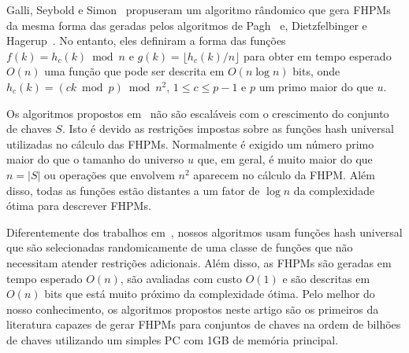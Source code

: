 Galli, Seybold e Simon~\cite{gss01} propuseram um algoritmo r\^andomico
que gera FHPMs da mesma forma das geradas pelos algoritmos de Pagh~\cite{p99}
e, Dietzfelbinger e Hagerup~\cite{dh01}. No entanto, eles definiram a forma das 
fun\c{c}\~oes $f(k) = h_c(k) \bmod n$ e $g(k) = \lfloor h_c(k)/n \rfloor$ para obter em tempo esperado $O(n)$ uma fun\c{c}\~ao que pode ser descrita em $O(n\log n)$ bits, onde
$h_c(k) = (ck \bmod p) \bmod n^2$, $1 \leq c \leq  p-1$ e $p$ um primo maior do que $u$.

Os algoritmos propostos em~\cite{p99,dh01,gss01} n\~ao s\~ao escal\'aveis com o crescimento do
conjunto de chaves $S$. Isto \'e devido as restri\c{c}\~oes impostas sobre as fun\c{c}\~oes
hash universal utilizadas no c\'alculo das FHPMs. Normalmente \'e exigido um 
n\'umero primo maior do que o tamanho do universo $u$ que, em geral, \'e muito maior
do que $n=|S|$ ou opera\c{c}\~oes que envolvem $n^2$ aparecem no c\'alculo da FHPM.
Al\'em disso, todas as fun\c{c}\~oes est\~ao distantes a um fator de $\log n$ da complexidade 
\'otima para descrever FHPMs.
  
Diferentemente dos trabalhos em~\cite{p99,dh01,gss01}, nossos algoritmos usam  
fun\c{c}\~oes hash universal que s\~ao selecionadas randomicamente de uma classe 
de fun\c{c}\~oes que n\~ao necessitam atender restri\c{c}\~oes adicionais.
Al\'em disso, as FHPMs s\~ao geradas em tempo esperado $O(n)$, s\~ao avaliadas 
com custo $O(1)$ e s\~ao descritas em $O(n)$ bits que est\'a muito pr\'oximo da
complexidade \'otima. 
Pelo melhor do nosso conhecimento, os algoritmos propostos neste artigo s\~ao
os primeiros da literatura capazes de gerar FHPMs para conjuntos de chaves na
ordem de bilh\~oes de chaves utilizando um simples PC com 1GB de mem\'oria principal.